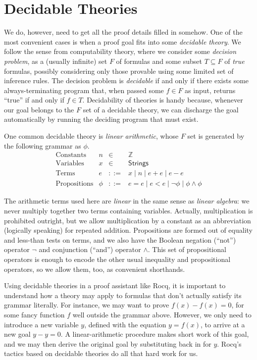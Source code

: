 \documentclass{amsbook}
\theoremstyle{definition}
\theoremstyle{remark}
\numberwithin{section}{chapter}
\numberwithin{equation}{chapter}
\begin{document}
\section{\label{decidable}Decidable Theories}

We do, however, need to get all the proof details filled in somehow.
One of the most convenient cases is when a proof goal fits into some \emph{decidable theory}.
We follow the sense from computability theory, where we consider some \emph{decision problem}, as a (usually infinite) set $F$ of formulas and some subset $T \subseteq F$ of \emph{true} formulas, possibly considering only those provable using some limited set of inference rules.
The decision problem is \emph{decidable} if and only if there exists some always-terminating program that, when passed some $f \in F$ as input, returns ``true'' if and only if $f \in T$.
Decidability of theories is handy because, whenever our goal belongs to the $F$ set of a decidable theory, we can discharge the goal automatically by running the deciding program that must exist.

One common decidable theory is \emph{linear arithmetic}, whose $F$ set is generated by the following grammar as $\phi$.
$$\begin{array}{rrcl}
  \textrm{Constants} & n &\in& \mathbb Z \\
  \textrm{Variables} & x &\in& \mathsf{Strings} \\
  \textrm{Terms} & e &::=& x \mid n \mid e + e \mid e - e \\
  \textrm{Propositions} & \phi &::=& e = e \mid e < e \mid \neg \phi \mid \phi \land \phi
\end{array}$$

The arithmetic terms used here are \emph{linear} in the same sense as \emph{linear algebra}: we never multiply together two terms containing variables.
Actually, multiplication is prohibited outright, but we allow multiplication by a constant as an abbreviation (logically speaking) for repeated addition.
Propositions are formed out of equality and less-than tests on terms, and we also have the Boolean negation (``not'') operator $\neg$ and conjunction (``and'') operator $\land$.
This set of propositional operators is enough to encode the other usual inequality and propositional operators, so we allow them, too, as convenient shorthands.

Using decidable theories in a proof assistant like Rocq, it is important to understand how a theory may apply to formulas that don't actually satisfy its grammar literally.
For instance, we may want to prove $f(x) - f(x) = 0$, for some fancy function $f$ well outside the grammar above.
However, we only need to introduce a new variable $y$, defined with the equation $y = f(x)$, to arrive at a new goal $y - y = 0$.
A linear-arithmetic procedure makes short work of this goal, and we may then derive the original goal by substituting back in for $y$.
Rocq's tactics based on decidable theories do all that hard work for us.
\end{document}
